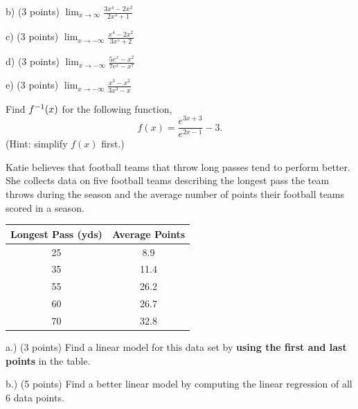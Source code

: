 \documentclass[11pt]{article}
\newcommand{\inv}{\ensuremath ^{-1}}
\begin{document}
\begin{questions}
\vspace{1.25in}

b) (3 points)  $\displaystyle \lim_{x\to\infty} \frac{3x^4 - 2x^2}{2x^3 +1}$

\vspace{1.25in}

c)  (3 points)  $\displaystyle \lim_{x\to-\infty} \frac{x^4 - 2x^2}{3x^5 +2}$

\vspace{1.25in}

d) (3 points) $\displaystyle \lim_{x\to-\infty} \frac{5e^x - x^2}{7e^x -x^7}$

\vspace{1.25in}

e)  (3 points) $\displaystyle \lim_{x\to-\infty} \frac{x^3 - x^2}{3x^3 -x}$

\vspace{1.25in}


\question[10] Find $f\inv(x)$ for the following function,
\[f(x) = \frac{e^{3x+3}}{e^{2x-1}} - 3.\]
(Hint: simplify $f(x)$ first.)
\vspace{3.25in}


\question[15] Katie believes that football teams that throw long passes tend to perform better.  She collects data on five football teams describing the longest pass the team throws during the season and the average number of points their football teams scored in a season.  \\
\begin{center}
  \begin{tabular}{| c | c |}
    \hline
    Longest Pass (yds) & Average Points \\ \hline \hline
    25 & 8.9  \\ \hline
    35 & 11.4  \\ \hline
    55 & 26.2  \\ \hline
    60 & 26.7  \\ \hline
    70 & 32.8  \\ \hline
  \end{tabular}
\end{center}

a.) (3 points) Find a linear model for this data set by \textbf{using the first and last points} in the table.
\vspace{1.5in}

b.) (5 points) Find a better linear model by computing the linear regression of all 6 data points.
\vspace{1in}



\end{questions}
\end{document}
